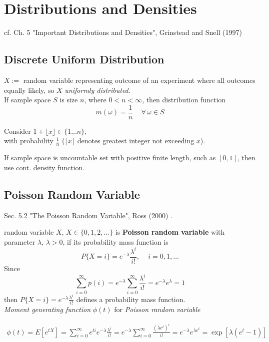\section{Distributions and Densities}

cf. Ch. 5 "Important Distributions and Densities", Grinstead and Snell (1997) \cite{dgdt:GrSn1997}

\subsection{Discrete Uniform Distribution}

$X:=$ random variable representing outcome of an experiment where all outcomes equally likely, so $X$ \emph{uniformly distributed}. \\

If sample space $S$ is size $n$, where $0 < n < \infty$, then distribution function
\[
m(\omega) = \frac{1}{n} \quad \, \forall \, \omega \in S
\]

Consider $1 + \lfloor x \rfloor \in \lbrace 1 \dots n \rbrace$, \\
with probability $\frac{1}{n}$ ($\lfloor x \rfloor$ denotes greatest integer not exceeding $x$).

If sample space is uncountable set with positive finite length, such as $[0, 1]$, then use cont. density function.

\subsection{Poisson Random Variable}

Sec. 5.2 "The Poisson Random Variable", Ross (2000) \cite{dgdt:Ross2000}.

random variable $X$, $X \in \lbrace 0, 1, 2, \dots \rbrace$ is \textbf{Poisson random variable} with parameter $\lambda$, $\lambda > 0$, if its probability mass function is 
\begin{equation}
P \lbrace X = i \rbrace = e^{-\lambda} \frac{\lambda^i }{ i!}, \quad \, i = 0, 1, \dots
\end{equation}
Since 
\[
\sum_{i=0}^{\infty} p(i) = e^{-\lambda} \sum_{i=0}^{\infty} \frac{\lambda^i}{i!} = e^{-\lambda} e^{\lambda} = 1
\]
then $P\lbrace X = i \rbrace = e^{-\lambda} \frac{ \lambda^i}{i!}$ defines a probability mass function. \\

\emph{Moment generating function} $\phi(t)$ for \emph{Poisson random variable}

\begin{equation}
	\begin{gathered}
		\phi(t) = E[e^{tX}] = \sum_{i=0}^{\infty} e^{ti} e^{-\lambda} \frac{\lambda^i}{i!} = e^{-\lambda} \sum_{i=0}^{\infty} \frac{ (\lambda e^t)^i }{ i!} = e^{-\lambda} e^{\lambda e^t} = \exp{ [ \lambda ( e^t - 1 )]}
	\end{gathered}
\end{equation}

